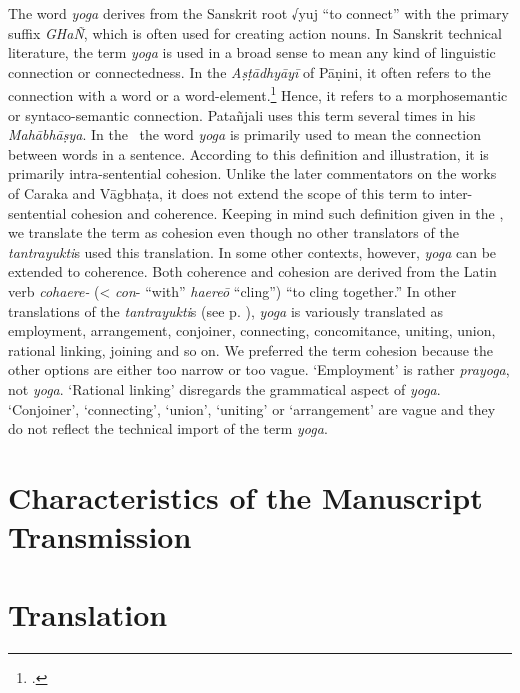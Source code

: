 The word \emph{yoga} derives from the Sanskrit root √yuj “to connect” with the primary suffix \emph{GHaÑ}, which is often used for creating action nouns. In Sanskrit technical literature, the term \emph{yoga} is used in a broad sense to mean any kind of linguistic connection or connectedness. In the \emph{Aṣṭādhyāyī} of Pāṇini, it often refers to the connection with a word or a word-element.\footnote{\cite[64]{josh-1991}.} Hence, it refers to a morphosemantic or syntaco-semantic connection. Patañjali uses this term several times in his \emph{Mahābhāṣya}. In the \SS\, the word \emph{yoga} is primarily used to mean the connection between words in a sentence. According to this definition and illustration, it is primarily intra-sentential cohesion. Unlike the later commentators on the works of Caraka and Vāgbhaṭa, it does not extend the scope of this term to inter-sentential cohesion and coherence. Keeping in mind such definition given in the \SS, we translate the term as cohesion even though no other translators of the \emph{tantrayukti}s used this translation. In some other contexts, however, \emph{yoga} can be extended to coherence. Both coherence and cohesion are derived from the Latin verb \emph{cohaere-} (< \emph{con}- “with” \emph{haereō} “cling”) “to cling together.”  In other translations of the \emph{tantrayukti}s (see p. \pageref{tantra-trans}), \emph{yoga} is variously translated as employment, arrangement, conjoiner, connecting, concomitance, uniting, union, rational linking, joining and so on. We preferred the term cohesion because the other options are either too narrow or too vague. `Employment' is rather \emph{prayoga}, not \emph{yoga}. `Rational linking' disregards the grammatical aspect of \emph{yoga}. `Conjoiner', `connecting', `union', `uniting' or `arrangement' are vague and they do not reflect the technical import of the term \emph{yoga}.  


\section{Characteristics of the Manuscript Transmission}


\newpage
\section{Translation}

